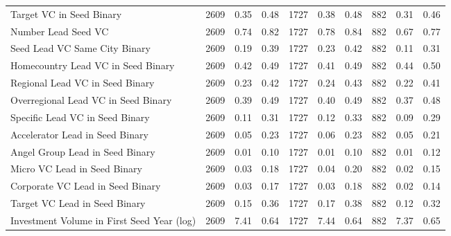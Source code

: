 {\begin{table}[!h]
{\begin{tabular}[t]{lrrrrrrrrr}
Target VC in Seed Binary & 2609 & 0.35 & 0.48 & 1727 & 0.38 & 0.48 & 882 & 0.31 & 0.46\\
Number Lead Seed VC & 2609 & 0.74 & 0.82 & 1727 & 0.78 & 0.84 & 882 & 0.67 & 0.77\\
Seed Lead VC Same City Binary & 2609 & 0.19 & 0.39 & 1727 & 0.23 & 0.42 & 882 & 0.11 & 0.31\\
Homecountry Lead VC in Seed Binary & 2609 & 0.42 & 0.49 & 1727 & 0.41 & 0.49 & 882 & 0.44 & 0.50\\
\addlinespace
Regional Lead VC in Seed Binary & 2609 & 0.23 & 0.42 & 1727 & 0.24 & 0.43 & 882 & 0.22 & 0.41\\
Overregional Lead VC in Seed Binary & 2609 & 0.39 & 0.49 & 1727 & 0.40 & 0.49 & 882 & 0.37 & 0.48\\
Specific Lead VC in Seed Binary & 2609 & 0.11 & 0.31 & 1727 & 0.12 & 0.33 & 882 & 0.09 & 0.29\\
Accelerator Lead in Seed Binary & 2609 & 0.05 & 0.23 & 1727 & 0.06 & 0.23 & 882 & 0.05 & 0.21\\
Angel Group Lead in Seed Binary & 2609 & 0.01 & 0.10 & 1727 & 0.01 & 0.10 & 882 & 0.01 & 0.12\\
\addlinespace
Micro VC Lead in Seed Binary & 2609 & 0.03 & 0.18 & 1727 & 0.04 & 0.20 & 882 & 0.02 & 0.15\\
Corporate VC Lead in Seed Binary & 2609 & 0.03 & 0.17 & 1727 & 0.03 & 0.18 & 882 & 0.02 & 0.14\\
Target VC Lead in Seed Binary & 2609 & 0.15 & 0.36 & 1727 & 0.17 & 0.38 & 882 & 0.12 & 0.32\\
Investment Volume in First Seed Year (log) & 2609 & 7.41 & 0.64 & 1727 & 7.44 & 0.64 & 882 & 7.37 & 0.65\\
\bottomrule
\end{tabular}}
\end{table}
}
